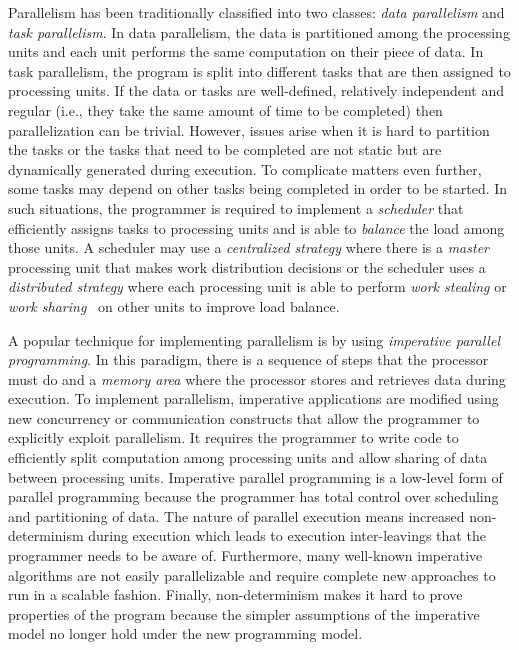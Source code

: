 Parallelism has been traditionally classified into two classes: \emph{data
parallelism} and \emph{task parallelism}. In data parallelism, the data is
partitioned among the processing units and each unit performs the same
computation on their piece of data. In task parallelism, the program is split
into different tasks that are then assigned to processing units. If the data or
tasks are well-defined, relatively independent and regular (i.e., they take the
same amount of time to be completed) then parallelization can be trivial.
However, issues arise when it is hard to partition the tasks or the tasks that
need to be completed are not static but are dynamically generated during
execution. To complicate matters even further, some tasks may depend on other
tasks being completed in order to be started. In such situations, the programmer
is required to implement a \emph{scheduler} that efficiently assigns tasks to
processing units and is able to \emph{balance} the load among those units. A
scheduler may use a \emph{centralized strategy} where there is a \emph{master}
processing unit that makes work distribution decisions or the scheduler uses a
\emph{distributed strategy} where each processing unit is able to perform
\emph{work stealing} or \emph{work sharing}~\cite{Blumofe:1999} on other units
to improve load balance.

A popular technique for implementing parallelism is by using \emph{imperative
parallel programming}. In this paradigm, there is a sequence of steps
that the processor must do and a \emph{memory area} where the processor stores
and retrieves data during execution. To implement parallelism,
imperative applications are modified using new concurrency or communication
constructs that allow the programmer to explicitly exploit parallelism. It
requires the programmer to write code to efficiently split computation among
processing units and allow sharing of data between processing units. Imperative
parallel programming is a low-level form of parallel programming because the
programmer has total control over scheduling and partitioning of data. The
nature of parallel execution means increased non-determinism during execution
which leads to execution inter-leavings that the programmer needs to be aware
of.  Furthermore, many well-known imperative algorithms are not easily
parallelizable and require complete new approaches to run in a scalable fashion.
Finally, non-determinism makes it hard to prove properties of the program
because the simpler assumptions of the imperative model no longer hold under the
new programming model.


